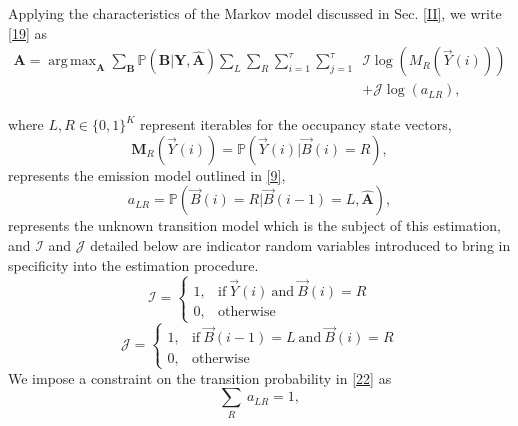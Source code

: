 \documentclass[10pt,twocolumn]{IEEEtran}
\newcommand{\nm}[1]{}
\DeclareMathOperator*{\argmax}{arg\,max}
\begin{document}
\nm{this is NOT the same as \eqref{18}...this is just the EM algorithm, you dont need to go through its derivations.. just say that you use the EM algorithm and provides the two steps of the algorithm (Estep and Mstep)}
Applying the characteristics of the Markov model discussed in Sec. \ref{II}, we write \eqref{19} as
\begin{equation}\label{20}
    \begin{aligned}
        \mathbf{A}=\argmax_{\mathbf{A}}\sum_{\mathbf{B}}\mathbb{P}(\mathbf{B}|\mathbf{Y},\hat{\mathbf{A}})\sum_{L}\sum_{R}\sum_{i=1}^{\tau}\sum_{j=1}^{\tau}&\mathcal{I}\log(M_R(\vec{Y}(i)))\\
        &+\mathcal{J}\log(a_{LR}),
    \end{aligned}
\end{equation}
\nm{where is the dependence on A here? Everything seems to depend on $\hat A$}
where $L,R \in \{0,1\}^K$ represent iterables\nm{?} for the occupancy state vectors,
\begin{equation}\label{21}
    \mathbf{M}_R(\vec{Y}(i)) = \mathbb{P}(\vec{Y}(i)|\vec{B}(i)=R),
\end{equation}
represents the emission model outlined in \eqref{9},
\begin{equation}\label{22}
    a_{LR} = \mathbb{P}(\vec{B}(i)=R|\vec{B}(i-1)=L, \hat{\mathbf{A}}),
\end{equation}
represents the unknown transition model which is the subject of this estimation, and $\mathcal{I}$ and $\mathcal{J}$ detailed below are indicator random variables introduced to bring in specificity into the estimation procedure.
\begin{equation}\label{23}
    \mathcal{I} = 
    \begin{cases}
        1, &\text{if}\ \vec{Y}(i)\ \text{and}\ \vec{B}(i)=R\nm{what does "if Y" mean? If Y what?}\\
        0, &\text{otherwise}
    \end{cases}
\end{equation}
\begin{equation}\label{24}
    \mathcal{J} = 
    \begin{cases}
        1, &\text{if}\ \vec{B}(i-1)=L\ \text{and}\ \vec{B}(i)=R\\
        0, &\text{otherwise}
    \end{cases}
\end{equation}
We impose a constraint on the transition probability in \eqref{22} as 
\begin{equation}\label{25}
    \sum_{R}\ a_{LR} = 1,    
\end{equation}
\end{document}
